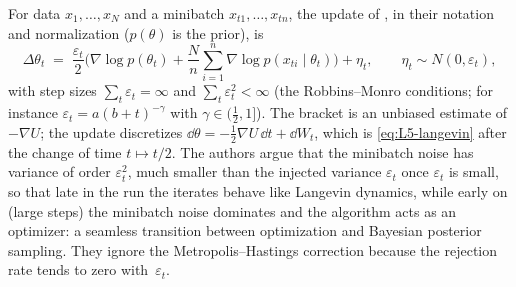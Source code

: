 \begin{beyond}
For data $x_1,\dots,x_N$ and a minibatch $x_{t1},\dots,x_{tn}$, the update of \citet{welling2011}, in their notation and normalization ($p(\theta)$ is the prior), is
\[
  \Delta\theta_t\;=\;\frac{\varepsilon_t}2\Big(\nabla\log p(\theta_t)+\frac Nn\sum_{i=1}^n\nabla\log p(x_{ti}\mid\theta_t)\Big)+\eta_t,\qquad\eta_t\sim N(0,\varepsilon_t),
\]
with step sizes $\sum_t\varepsilon_t=\infty$ and $\sum_t\varepsilon_t^2<\infty$ (the Robbins--Monro conditions; for instance $\varepsilon_t=a(b+t)^{-\gamma}$ with $\gamma\in(\frac12,1]$). The bracket is an unbiased estimate of $-\nabla U$; the update discretizes $\dd\theta=-\frac12\nabla U\,\dd t+\dd W_t$, which is \eqref{eq:L5-langevin} after the change of time $t\mapsto t/2$. The authors argue that the minibatch noise has variance of order $\varepsilon_t^2$, much smaller than the injected variance $\varepsilon_t$ once $\varepsilon_t$ is small, so that late in the run the iterates behave like Langevin dynamics, while early on (large steps) the minibatch noise dominates and the algorithm acts as an optimizer: a seamless transition between optimization and Bayesian posterior sampling. They ignore the Metropolis--Hastings correction because the rejection rate tends to zero with~$\varepsilon_t$.


\end{beyond}

